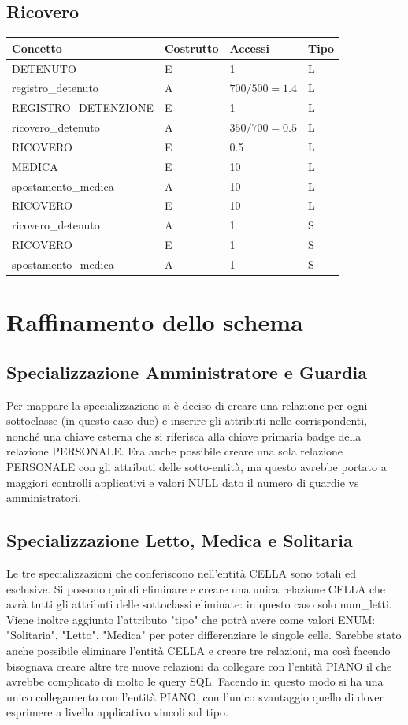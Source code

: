 \documentclass[a4paper,12pt]{report}
\begin{document}
\subsection{Ricovero}
\begin{table}[H]
\begin{tabular}{p{5cm} p{2cm} p{3cm} p{1cm}}
\hline
Concetto & Costrutto & Accessi & Tipo \\ \hline
DETENUTO & E & 1 & L \\
registro\_detenuto & A & \(700 / 500 = 1.4 \) & L \\
REGISTRO\_DETENZIONE & E & 1 & L \\
ricovero\_detenuto & A & \(350 / 700 = 0.5\) & L \\
RICOVERO & E & 0.5 & L \\
MEDICA & E & 10 & L \\
spostamento\_medica & A & 10 & L \\
RICOVERO & E & 10 & L \\
ricovero\_detenuto & A & 1 & S \\
RICOVERO & E & 1 & S \\
spostamento\_medica & A & 1 & S \\
\end{tabular}
\end{table}
\section{Raffinamento dello schema}
\subsection{Specializzazione Amministratore e Guardia}
Per mappare la specializzazione si è deciso di creare una relazione per ogni sottoclasse (in questo caso due) e inserire gli attributi nelle corrispondenti, nonché una chiave esterna che si riferisca alla chiave primaria badge della relazione PERSONALE.
%
Era anche possibile creare una sola relazione PERSONALE con gli attributi delle sotto-entità, ma questo avrebbe portato a maggiori controlli applicativi e valori NULL dato il numero di guardie vs amministratori.
\subsection{Specializzazione Letto, Medica e Solitaria}
Le tre specializzazioni che conferiscono nell'entità CELLA sono totali ed esclusive.
%
Si possono quindi eliminare e creare una unica relazione CELLA che avrà tutti gli attributi delle sottoclassi eliminate: in questo caso solo num\_letti.
%
Viene inoltre aggiunto l'attributo "tipo" che potrà avere come valori ENUM: "Solitaria", "Letto", "Medica" per poter differenziare le singole celle.
%
Sarebbe stato anche possibile eliminare l'entità CELLA e creare tre relazioni, ma così facendo bisognava creare altre tre nuove relazioni da collegare con l'entità PIANO il che avrebbe complicato di molto le query SQL.
%
Facendo in questo modo si ha una unico collegamento con l'entità PIANO, con l'unico svantaggio quello di dover esprimere a livello applicativo vincoli sul tipo.
\end{document}
